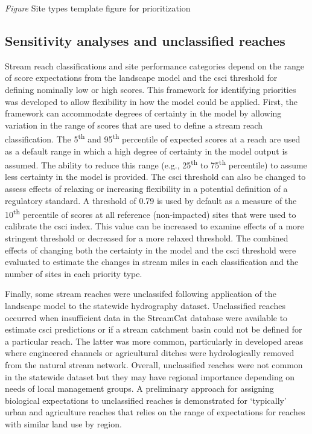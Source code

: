 \documentclass[]{article}
\begin{document}
\emph{Figure} Site types template figure for prioritization

\subsection{Sensitivity analyses and unclassified
reaches}\label{sensitivity-analyses-and-unclassified-reaches}

Stream reach classifications and site performance categories depend on
the range of score expectations from the landscape model and the
\ac{csci} threshold for defining nominally low or high scores. This
framework for identifying priorities was developed to allow flexibility
in how the model could be applied. First, the framework can accommodate
degrees of certainty in the model by allowing variation in the range of
scores that are used to define a stream reach classification. The
5\textsuperscript{th} and 95\textsuperscript{th} percentile of expected
scores at a reach are used as a default range in which a high degree of
certainty in the model output is assumed. The ability to reduce this
range (e.g., 25\textsuperscript{th} to 75\textsuperscript{th}
percentile) to assume less certainty in the model is provided. The
\ac{csci} threshold can also be changed to assess effects of relaxing or
increasing flexibility in a potential definition of a regulatory
standard. A threshold of 0.79 is used by default as a measure of the
10\textsuperscript{th} percentile of scores at all reference
(non-impacted) sites that were used to calibrate the \ac{csci} index.
This value can be increased to examine effects of a more stringent
threshold or decreased for a more relaxed threshold. The combined
effects of changing both the certainty in the model and the \ac{csci}
threshold were evaluated to estimate the changes in stream miles in each
classification and the number of sites in each priority type.

Finally, some stream reaches were unclassifed following application of
the landscape model to the statewide hydrography dataset. Unclassified
reaches occurred when insufficient data in the StreamCat database were
available to estimate \ac{csci} predictions or if a stream catchment
basin could not be defined for a particular reach. The latter was more
common, particularly in developed areas where engineered channels or
agricultural ditches were hydrologically removed from the natural stream
network. Overall, unclassified reaches were not common in the statewide
dataset but they may have regional importance depending on needs of
local management groups. A preliminary approach for assigning biological
expectations to unclassified reaches is demonstrated for `typically'
urban and agriculture reaches that relies on the range of expectations
for reaches with similar land use by region.
\end{document}
